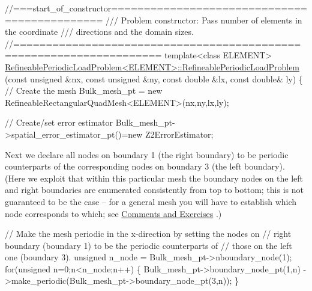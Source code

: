 \begin{DoxyCodeInclude}
\textcolor{comment}{//===start\_of\_constructor=============================================}
\textcolor{comment}{/// Problem constructor: Pass number of elements in the coordinate}
\textcolor{comment}{}\textcolor{comment}{/// directions and the domain sizes.}
\textcolor{comment}{}\textcolor{comment}{//====================================================================}
\textcolor{keyword}{template}<\textcolor{keyword}{class} ELEMENT>
\hyperlink{classRefineablePeriodicLoadProblem_ae950fdcf80e684eddb29358e1f9a3412}{RefineablePeriodicLoadProblem<ELEMENT>::RefineablePeriodicLoadProblem}
(\textcolor{keyword}{const} \textcolor{keywordtype}{unsigned} &nx, \textcolor{keyword}{const} \textcolor{keywordtype}{unsigned} &ny,
 \textcolor{keyword}{const} \textcolor{keywordtype}{double} &lx, \textcolor{keyword}{const} \textcolor{keywordtype}{double}& ly)
\{
 \textcolor{comment}{// Create the mesh }
 Bulk\_mesh\_pt = \textcolor{keyword}{new} RefineableRectangularQuadMesh<ELEMENT>(nx,ny,lx,ly);
 
 \textcolor{comment}{// Create/set error estimator}
 Bulk\_mesh\_pt->spatial\_error\_estimator\_pt()=\textcolor{keyword}{new} Z2ErrorEstimator;

\end{DoxyCodeInclude}


Next we declare all nodes on boundary 1 (the right boundary) to be periodic counterparts of the corresponding nodes on boundary 3 (the left boundary). (Here we exploit that within this particular mesh the boundary nodes on the left and right boundaries are enumerated consistently from top to bottom; this is not guaranteed to be the case -- for a general mesh you will have to establish which node corresponds to which; see \hyperlink{index_comments}{Comments and Exercises} .)


\begin{DoxyCodeInclude}
 
 \textcolor{comment}{// Make the mesh periodic in the x-direction by setting the nodes on}
 \textcolor{comment}{// right boundary (boundary 1) to be the periodic counterparts of}
 \textcolor{comment}{// those on the left one (boundary 3).}
 \textcolor{keywordtype}{unsigned} n\_node = Bulk\_mesh\_pt->nboundary\_node(1);
 \textcolor{keywordflow}{for}(\textcolor{keywordtype}{unsigned} n=0;n<n\_node;n++)
  \{
   Bulk\_mesh\_pt->boundary\_node\_pt(1,n)
    ->make\_periodic(Bulk\_mesh\_pt->boundary\_node\_pt(3,n));
  \}

\end{DoxyCodeInclude}


